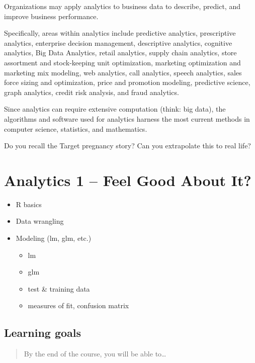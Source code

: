 \documentclass[
]{book}
\providecommand{\tightlist}{%
  \setlength{\itemsep}{0pt}\setlength{\parskip}{0pt}}
\theoremstyle{definition}
\theoremstyle{definition}
\theoremstyle{definition}
\theoremstyle{definition}
\theoremstyle{remark}
\begin{document}
Organizations may apply analytics to business data to describe, predict, and improve business performance.

Specifically, areas within analytics include predictive analytics, prescriptive analytics, enterprise decision management, descriptive analytics, cognitive analytics, Big Data Analytics, retail analytics, supply chain analytics, store assortment and stock-keeping unit optimization, marketing optimization and marketing mix modeling, web analytics, call analytics, speech analytics, sales force sizing and optimization, price and promotion modeling, predictive science, graph analytics, credit risk analysis, and fraud analytics.

Since analytics can require extensive computation (think: big data), the algorithms and software used for analytics harness the most current methods in computer science, statistics, and mathematics.

Do you recall the Target pregnancy story? Can you extrapolate this to real life?

\hypertarget{analytics-1-feel-good-about-it}{%
\chapter{Analytics 1 -- Feel Good About It?}\label{analytics-1-feel-good-about-it}}

\begin{itemize}
\tightlist
\item
  R basics
\item
  Data wrangling
\item
  Modeling (lm, glm, etc.)

  \begin{itemize}
  \tightlist
  \item
    lm
  \item
    glm
  \item
    test \& training data
  \item
    measures of fit, confusion matrix
  \end{itemize}
\end{itemize}

\hypertarget{learning-goals}{%
\section{Learning goals}\label{learning-goals}}

\begin{quote}
By the end of the course, you will be able to\ldots{}
\end{quote}
\end{document}
